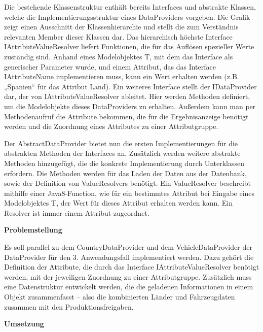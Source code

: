Die bestehende Klassenstruktur enthält bereits Interfaces und abstrakte Klassen, welche die Implementierungsstruktur eines DataProviders vorgeben. Die Grafik zeigt einen Ausschnitt der Klassenhierarchie und stellt die zum Verständnis relevanten Member dieser Klassen dar. Das hierarchisch höchste Interface IAttributeValueResolver liefert Funktionen, die für das Auflösen spezieller Werte zuständig sind. Anhand eines Modelobjektes T, mit dem das Interface als generischer Parameter wurde, und einem Attribut, das das Interface IAttributeName implementieren muss, kann ein Wert erhalten werden (z.B. „Spanien“ für das Attribut Land).
Ein weiteres Interface stellt der IDataProvider dar, der von IAttributeValueResolver ableitet. Hier werden Methoden definiert, um die Modelobjekte dieses DataProviders zu erhalten. Außerdem kann man per Methodenaufruf die Attribute bekommen, die für die Ergebnisanzeige benötigt werden und die Zuordnung eines Attributes zu einer Attributgruppe.

Der AbstractDataProvider bietet nun die ersten Implementierungen für die abstrakten Methoden der Interfaces an. Zusätzlich werden weitere abstrakte Methoden hinzugefügt, die die konkrete Implementierung durch Unterklassen erfordern. Die Methoden werden für das Laden der Daten aus der Datenbank, sowie der Definition von ValueResolvers  benötigt. Ein ValueResolver beschreibt mithilfe einer Java8-Function, wie für ein bestimmtes Attribut bei Eingabe eines Modelobjektes T, der Wert für dieses Attribut erhalten werden kann. Ein Resolver ist immer einem Attribut zugeordnet.

\textbf{Problemstellung}

Es soll parallel zu dem CountryDataProvider und dem VehicleDataProvider der DataProvider für den 3. Anwendungsfall implementiert werden. Dazu gehört die Definition der Attribute, die durch das Interface IAttributeValueResolver benötigt werden, mit der jeweiligen Zuordnung zu einer Attributgruppe. Zusätzlich muss eine Datenstruktur entwickelt werden, die die geladenen Informationen in einem Objekt zusammenfasst – also die kombinierten Länder und Fahrzeugdaten zusammen mit den Produktionsfreigaben.

\textbf{Umsetzung}

